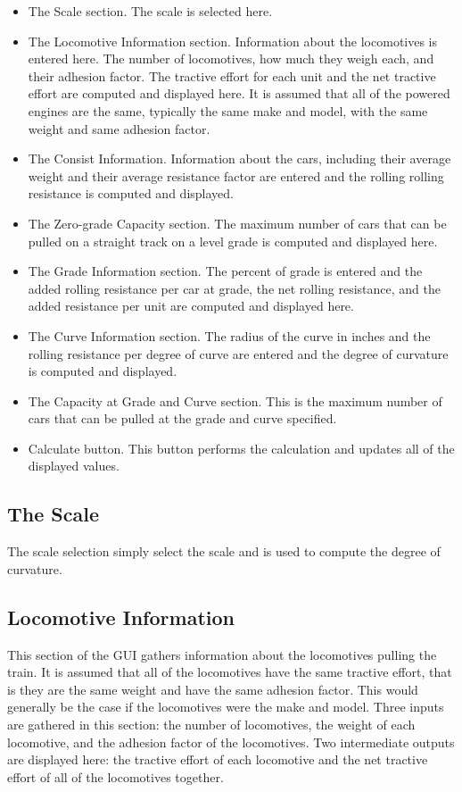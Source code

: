 \begin{itemize}
\item The Scale section.  The scale is selected here.
\item The Locomotive Information section.  Information about the
locomotives is entered here.  The number of locomotives, how much they
weigh each, and their adhesion factor. The tractive effort for each unit
and the net tractive effort are computed and displayed here. It is
assumed that all of the powered engines are the same, typically the same
make and model, with the same weight and same adhesion factor.
\item The Consist Information. Information about the cars, including
their average weight and their average resistance factor are entered and
the rolling rolling resistance is computed and displayed.
\item The Zero-grade Capacity section.  The maximum number of cars that
can be pulled on a straight track on a level grade is computed and
displayed here.
\item The Grade Information section. The percent of grade is entered and
the added rolling resistance per car at grade, the net rolling
resistance, and the added resistance per unit are computed and displayed
here. 
\item The Curve Information section. The radius of the curve in inches
and the rolling resistance per degree of curve are entered and the
degree of curvature is computed and displayed.
\item The Capacity at Grade and Curve section.  This is the maximum
number of cars that can be pulled at the grade and curve specified.
\item Calculate button. This button performs the calculation and updates
all of the displayed values.
\end{itemize}

\subsection{The Scale}
The scale selection simply select the scale and is used to compute the
degree of curvature.

\subsection{Locomotive Information}
This section of the GUI gathers information about the locomotives
pulling the train.  It is assumed that all of the locomotives have the
same tractive effort, that is they are the same weight and have the same
adhesion factor.  This would generally be the case if the locomotives
were the make and model.  Three inputs are gathered in this section: the
number of locomotives, the weight of each locomotive, and the adhesion
factor of the locomotives.  Two intermediate outputs are displayed here:
the tractive effort of each locomotive and the net tractive effort of
all of the locomotives together.

